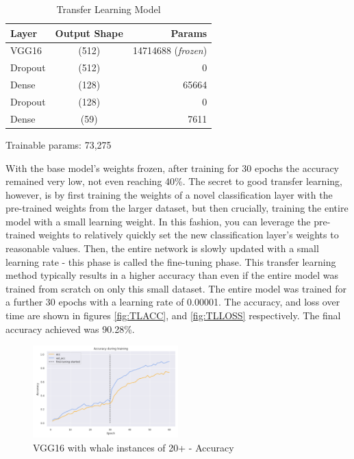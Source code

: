 \documentclass[paper=a4, fontsize=11pt]{scrartcl}
\numberwithin{equation}{section}		%
\numberwithin{table}{section}				%
\begin{document}
\begin{table}[!h]
  \begin{center}
    \caption{Transfer Learning Model}
    \label{tab:table2}
    \begin{tabular}{l|c|r} %
      \textbf{Layer} & \textbf{Output Shape} & \textbf{Params}\\
      \hline
      VGG16 & (512) & 14714688 (\textit{frozen})\\
      Dropout & (512) & 0\\
      Dense & (128) & 65664\\
      Dropout & (128) & 0\\
      Dense & (59) & 7611\\
    \end{tabular}
      \small
      \item Trainable params: 73,275
  \end{center}
\end{table}

With the base model's weights frozen, after training for 30 epochs the accuracy remained very low, not even reaching 40\%. The secret to good transfer learning, however, is by first training the weights of a novel classification layer with the pre-trained weights from the larger dataset, but then crucially, training the entire model with a small learning weight. In this fashion, you can leverage the pre-trained weights to relatively quickly set the new classification layer's weights to reasonable values. Then, the entire network is slowly updated with a small learning rate - this phase is called the fine-tuning phase. This transfer learning method typically results in a higher accuracy than even if the entire model was trained from scratch on only this small dataset. The entire model was trained for a further 30 epochs with a learning rate of 0.00001. The accuracy, and loss over time are shown in figures \autoref{fig:TLACC}, and \autoref{fig:TLLOSS} respectively. The final accuracy achieved was 90.28\%.

\begin{figure}[!h]
    \centering
    \includegraphics[width=0.5\textwidth]{TLaccuracy.png}
    \caption{VGG16 with whale instances of 20+ - Accuracy}
    \label{fig:TLACC}
\end{figure}
\end{document}
